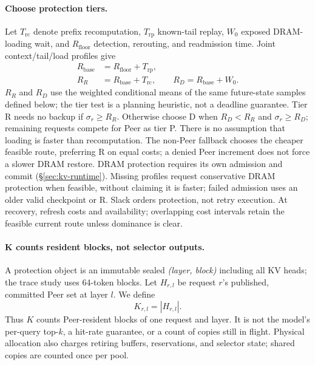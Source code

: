 \paragraph{Choose protection tiers.}
Let $T_{\mathrm{rc}}$ denote prefix recomputation, $T_{\mathrm{rp}}$ known-tail
replay, $W_0$ exposed DRAM-loading wait, and $R_{\mathrm{floor}}$ detection,
rerouting, and readmission time. Joint context/tail/load profiles give
\begin{equation}
\begin{aligned}
 R_{\mathrm{base}}&=R_{\mathrm{floor}}+T_{\mathrm{rp}},\\
 R_R&=R_{\mathrm{base}}+T_{\mathrm{rc}},\qquad
 R_D=R_{\mathrm{base}}+W_0.
\end{aligned}
\label{eq:recovery-base}
\end{equation}
$R_R$ and $R_D$ use the weighted conditional means of the same
future-state samples defined below; the tier test is a planning heuristic,
not a deadline guarantee. Tier R needs no backup if $\sigma_r\ge R_R$.
Otherwise choose D when $R_D<R_R$ and $\sigma_r\ge R_D$; remaining
requests compete for Peer as tier P. There is no assumption that loading
is faster than recomputation. The non-Peer fallback chooses the cheaper
feasible route, preferring R on equal costs; a denied Peer increment does
not force a slower DRAM restore. DRAM protection requires its own admission
and commit (\S\ref{sec:kv-runtime}). Missing profiles request conservative
DRAM protection when feasible, without claiming it is faster; failed
admission uses an older valid checkpoint or R. Slack orders protection,
not retry execution. At recovery, refresh costs and availability; overlapping
cost intervals retain the feasible current route unless dominance is clear.

\paragraph{K counts resident blocks, not selector outputs.}
A protection object is an immutable sealed \emph{(layer, block)} including
all KV heads; the trace study uses 64-token blocks. Let $H_{r,l}$ be
request $r$'s published, committed Peer set at layer $l$. We define
\begin{equation}
 K_{r,l}=|H_{r,l}|.
 \label{eq:hot-block-count}
\end{equation}
Thus $K$ counts Peer-resident blocks of one request and layer. It is not
the model's per-query top-$k$, a hit-rate guarantee, or a count of copies
still in flight. Physical allocation also charges retiring buffers,
reservations, and selector state; shared copies are counted once per pool.

